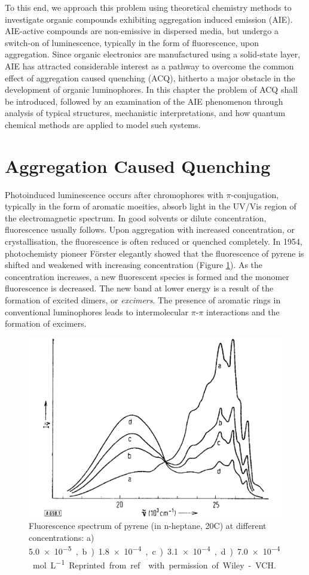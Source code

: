 To this end, we approach this problem using theoretical chemistry methods to investigate organic compounds exhibiting aggregation induced emission (AIE).  AIE-active compounds are non-emissive in dispersed media, but undergo a switch-on of luminescence, typically in the form of fluorescence, upon aggregation. Since organic electronics are manufactured using a solid-state layer, AIE has attracted considerable interest as a pathway to overcome the common effect of aggregation caused quenching (ACQ), hitherto a major obstacle in the development of organic luminophores. In this chapter the problem of ACQ shall be introduced, followed by an examination of the AIE phenomenon through analysis of typical structures, mechanistic interpretations, and how quantum chemical methods are applied to model such systems.
\section{Aggregation Caused Quenching}\label{section: lom ACQ}
Photoinduced luminescence occurs after chromophores with $\pi$-conjugation, typically in the form of aromatic moeities, absorb light in the UV/Vis region of the electromagnetic spectrum. In good solvents or dilute concentration, fluorescence usually follows. Upon aggregation with increased concentration, or crystallisation, the fluorescence is often reduced or quenched completely. In 1954, photochemisty pioneer  F\"{o}rster elegantly showed that the fluorescence of pyrene is shifted and weakened with increasing concentration (Figure \ref{figure: Forster_Spectra}).\cite{Forster1954,Forster1969} As the concentration increases, a new fluorescent species is formed and the monomer fluorescence is decreased. The new band at lower energy is a result of the formation of excited dimers, or \textit{excimers}. The presence of aromatic rings in conventional luminophores leads to intermolecular $\pi$-$\pi$ interactions and the formation of excimers. 
\begin{figure}[H]
\centering
  \includegraphics[width=0.6\linewidth]{Intro/Forster_Spectra.pdf}
  \caption[Fluorescence spectrum of pyrene]{Fluorescence spectrum of pyrene (in n-heptane, 20\degree{}C) at different concentrations: a) \SI{5.0e-5}, b) \SI{1.8e-4}, c) \SI{3.1e-4}, d) \SI{7.0e-4}{mol L^{-1}}. Reprinted from ref.~ with permission of Wiley-VCH.}
  \label{figure: Forster_Spectra}
\end{figure}
